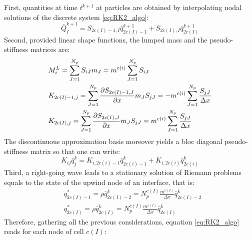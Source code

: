 First, quantities at time $t^{k+1}$ at particles are obtained by interpolating nodal solutions of the discrete system \eqref{eq:RK2_algo}: 
\begin{equation}
\bar{Q}^{k+1}_I = S_{2c(I)-1,I}\bar{q}_{2c(I)-1}^{k+1} + S_{2c(I),I}\bar{q}_{2c(I)}^{k+1} \label{eq:updated_MP}
\end{equation}
Second, provided linear shape functions, the lumped mass and the pseudo-stiffness matrices are:
\begin{align}
  & M^L_i = \sum_{J=1}^{N_p} S_{iJ} m_J = m^{c(i)} \sum_{J=1}^{N_p} S_{iJ}\\
  & K_{2c(I)-1,j} = \sum_{J=1}^{N_p} \frac{\partial S_{2c(I)-1,J}}{\partial x} m_J S_{jJ} = -m^{c(i)} \sum_{J=1}^{N_p} \frac{ S_{jJ}}{\Delta x} \\
  & K_{2c(I),j} = \sum_{J=1}^{N_p} \frac{\partial S_{2c(I),J}}{\partial x} m_J S_{jJ} = m^{c(i)}\sum_{J=1}^{N_p} \frac{ S_{jJ}}{\Delta x} 
\end{align}
The discontinuous approximation basis moreover yields a bloc diagonal pseudo-stiffness matrix so that one can write:
\begin{equation}
  \label{eq:block_diag_K}
  K_{ij} \bar{q}_{j}^{k}= K_{i,2c(i)-1} \bar{q}_{2c(i)-1}^{k}+K_{i,2c(i)} \bar{q}_{2c(i)}^{k}
\end{equation}
Third, a right-going wave leads to a stationary solution of Riemann problems equals to the state of the upwind node of an interface, that is:
\begin{align}
  & q_{2c(I)-1}^* = \rho \bar{q}^k_{2c(I)-2}=  N_p^{c(I)}\frac{ m^{c(I)}}{\Delta x}\bar{q}^k_{2c(I)-2} \\
  & q_{2c(I)}^* = \rho \bar{q}^k_{2c(I)} =  N_p^{c(I)}\frac{ m^{c(I)}}{\Delta x} \bar{q}^k_{2c(I)} 
\end{align}
Therefore, gathering all the previous considerations, equation \eqref{eq:RK2_algo} reads for each node of cell $c(I)$:
